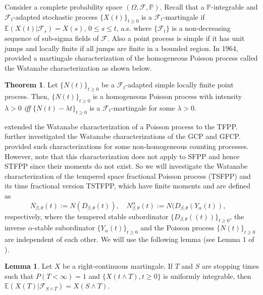 \documentclass[11pt,oneside,reqno]{amsart}
\theoremstyle{definition}
\newtheorem{theorem}{\bf Theorem}[section]
\newtheorem{lemma}{Lemma}[section]
\theoremstyle{remarkstyle}
\begin{document}
Consider a complete probability space $(\Omega,\mathcal{F},\mathbb{P})$. Recall that a $\mathbb{P}$-integrable and $\mathcal{F}_t$-adapted stochastic process $\{X(t)\}_{t\ge 0}$
is a $\mathcal{F}_t$-martingale if $\mathbb{E}(X(t)|\mathcal{F}_s)=X(s),\,0\le s\le t$, a.s. where $\{\mathcal{F}_t\}$ is a non-decreasing sequence of sub-sigma fields of $\mathcal{F}$. Also a point process is simple if it has unit jumps and locally finite if all jumps are finite in a bounded region. In 1964, \citet{Watanabe1964} provided a martingale characterization of the homogeneous Poisson process called the Watanabe characterization as shown below.
\begin{theorem}\label{Watanabe_Poisson}
    Let $\{N(t)\}_{t\ge 0}$ be a $\mathcal{F}_t$-adapted simple locally finite point process. Then, $\{N(t)\}_{t\ge 0}$ is a homogeneous Poisson process with intensity $\lambda>0$ \textit{iff} $\{N(t)-\lambda t\}_{t\ge 0}$ is a $\mathcal{F}_t$-martingale for some $\lambda>0$.
\end{theorem}
\citet{Aletti2018} extended the Watanabe characterization of a Poisson process to the TFPP. \citet{Dhillon2024} further investigated the Watanabe characterizations of the GCP and GFCP. \citet{Tathe2025} provided such characterizations for some non-homogeneous counting processes. However, note that this characterization does not apply to SFPP and hence STFPP since their moments do not exist. So we will investigate the Watanabe characterization of the tempered space fractional Poisson process (TSFPP) and its time fractional version TSTFPP, which have finite moments and are defined as
\begin{equation*}
N_{\beta,\theta}(t):=N(D_{\beta,\theta}(t)),\quad N^{\alpha}_{\beta,\theta}(t):=N(D_{\beta,\theta}(Y_{\alpha}(t)), \quad 
\end{equation*}
respectively, where the tempered stable subordinator $\{ D_{\beta,\theta}((t))\}_{t\ge 0}$, the inverse $\alpha$-stable subordinator $\{Y_{\alpha}(t)\}_{t\ge 0}$ and the Poisson process $\{N(t)\}_{t\ge 0}$ are independent of each other. We will use the following lemma (see Lemma 1 of \citet{Aletti2018}).
\begin{lemma}\label{martingale_lemma}
    Let $X$ be a right-continuous martingale. If $T$ and $S$ are stopping times such that $P(T<\infty)=1$ and $\{X(t\wedge T),t\ge 0\}$ is uniformly integrable, then $\mathbb{E}(X(T)|\mathcal{F}_{S\wedge T})=X(S\wedge T)$.
\end{lemma}
\end{document}
